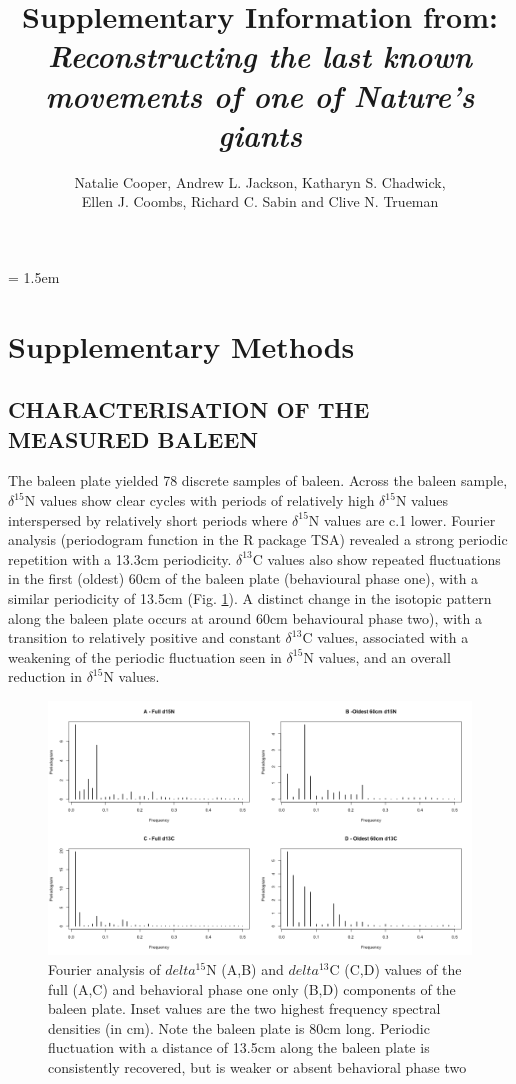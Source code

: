 \documentclass[a4paper,12pt]{article}
\title{Supplementary Information from:\\
\textit{Reconstructing the last known movements of one of Nature's giants}}
\author{Natalie Cooper, Andrew L. Jackson, Katharyn S. Chadwick,\\ 
Ellen J. Coombs, Richard C. Sabin and Clive N. Trueman}
\date{}
\begin{document}

\maketitle

\parindent = 1.5em
\addtolength{\parskip}{.3em}


\section*{Supplementary Methods}
 
\subsection*{CHARACTERISATION OF THE MEASURED BALEEN}
The baleen plate yielded 78 discrete samples of baleen. 
Across the baleen sample, $\delta^{15}$N values show clear cycles with periods of relatively high $\delta^{15}$N values interspersed by relatively short periods where $\delta^{15}$N values are c.1\text{\textperthousand} lower. 
Fourier analysis (periodogram function in the R package TSA\cite{Chan:2012aa}) revealed a strong periodic repetition with a 13.3cm periodicity. 
$\delta^{13}$C values also show repeated fluctuations in the first (oldest) 60cm of the baleen plate (behavioural phase one), with a similar periodicity of 13.5cm (Fig. \ref{figs1}). 
A distinct change in the isotopic pattern along the baleen plate occurs at around 60cm behavioural phase two), with a transition to relatively positive and constant $\delta^{13}$C values, associated with a weakening of the periodic fluctuation seen in $\delta^{15}$N values, and an overall reduction in $\delta^{15}$N values.

\begin{figure}[!htbp]
  \centering
  \includegraphics[width = \linewidth]{figures/Figure-S1-periodograms.png}
  \caption{Fourier analysis of $delta^{15}$N (A,B) and $delta^{13}$C (C,D) values of the full (A,C) and behavioral phase one only (B,D) components of the baleen plate. Inset values are the two highest frequency spectral densities (in cm). Note the baleen plate is 80cm long. Periodic fluctuation with a distance of 13.5cm along the baleen plate is consistently recovered, but is weaker or absent behavioral phase two} %
  \label{figs1}
\end{figure}
 
\end{document}

